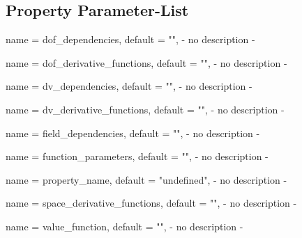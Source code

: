 \subsection{Property Parameter-List}

\begin{parameter}{
    name    = {dof_dependencies},
    default = {""},
}
- no description -
\end{parameter}

\begin{parameter}{
    name    = {dof_derivative_functions},
    default = {""},
}
- no description -
\end{parameter}

\begin{parameter}{
    name    = {dv_dependencies},
    default = {""},
}
- no description -
\end{parameter}

\begin{parameter}{
    name    = {dv_derivative_functions},
    default = {""},
}
- no description -
\end{parameter}

\begin{parameter}{
    name    = {field_dependencies},
    default = {""},
}
- no description -
\end{parameter}

\begin{parameter}{
    name    = {function_parameters},
    default = {""},
}
- no description -
\end{parameter}

\begin{parameter}{
    name    = {property_name},
    default = {"undefined"},
}
- no description -
\end{parameter}

\begin{parameter}{
    name    = {space_derivative_functions},
    default = {""},
}
- no description -
\end{parameter}

\begin{parameter}{
    name    = {value_function},
    default = {""},
}
- no description -
\end{parameter}


